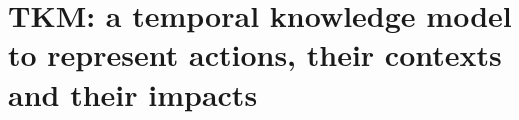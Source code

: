 \chapter[TKM: a temporal knowledge model]{TKM: a temporal knowledge model to represent actions, their contexts and their impacts}
\chapterPage{
%
%
 }
 
 
 
 


 
 






